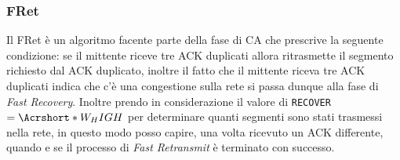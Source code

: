         \subsubsection{\Acrfull*{FRet}}
            Il \Acrlong*{FRet} è un algoritmo facente parte della fase di \Acrlong*{CA} che prescrive la seguente condizione: se il mittente riceve tre \Acrshort*{ACK} duplicati allora ritrasmette il segmento richiesto dal \Acrshort*{ACK} duplicato, inoltre il fatto che il mittente riceva tre \Acrshort*{ACK} duplicati indica che c'è una congestione sulla rete si passa dunque alla fase di \textit{Fast Recovery}. Inoltre prendo in considerazione il valore di \texttt{RECOVER}$=\Acrshort*{W_HIGH}$ per determinare quanti segmenti sono stati trasmessi nella rete, in questo modo posso capire, una volta ricevuto un \Acrshort*{ACK} differente, quando e se il processo di \textit{Fast Retransmit} è terminato con successo.
